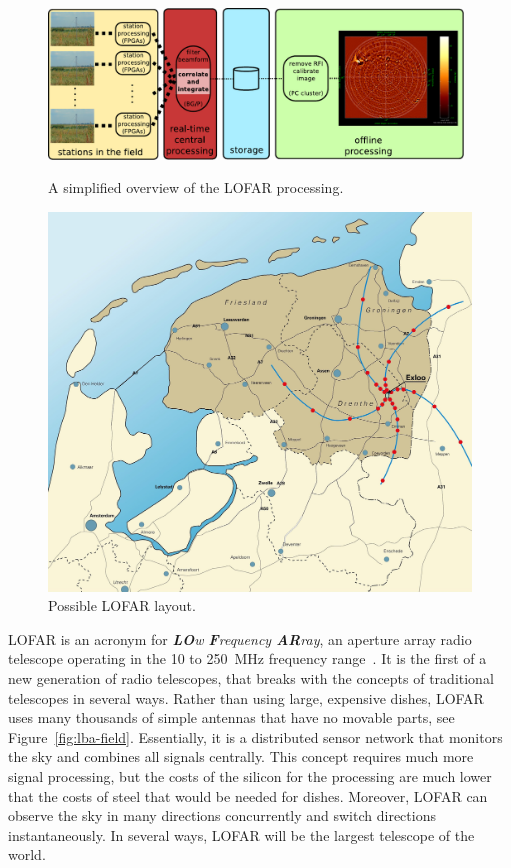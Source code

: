 \documentclass{article}
\begin{document}
\begin{figure}
\begin{minipage}[b]{11cm}
\includegraphics[width=11cm]{figures/lofar-overview.pdf}
\caption{A simplified overview of the LOFAR processing.}
\label{fig:lofar-overview}
\end{minipage}
\hfill
\begin{minipage}[b]{56mm}
\includegraphics[width=\columnwidth]{figures/map.jpg}
\caption{Possible LOFAR layout.}
\label{fig:map}
\end{minipage}
\end{figure}

LOFAR is an acronym for \emph{\textbf{LO}w \textbf{F}requency
  \textbf{AR}ray}, an aperture array radio telescope operating in the
10 to 250~MHz frequency range~\cite{Butcher:04,deVos:09}.  It is the first of a new generation of
radio telescopes, that breaks with the concepts of traditional
telescopes in several ways.  Rather than using large, expensive
dishes, LOFAR uses many thousands of simple antennas that have no
movable parts, see
Figure~\ref{fig:lba-field}.  Essentially, it is a distributed sensor
network that monitors the sky and combines all signals centrally.
This concept requires much more signal processing, but the 
costs of the silicon for the processing are much lower that the costs of steel that would
be needed for dishes. Moreover, LOFAR can observe the sky in many
directions concurrently and switch directions instantaneously.  In
several ways, LOFAR will be the largest telescope of the world.
\end{document}
